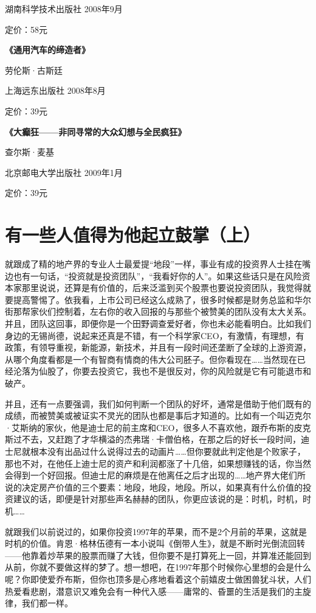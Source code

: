 湖南科学技术出版社 2008年9月

定价：58元

\textbf{《通用汽车的缔造者》}

劳伦斯·古斯廷

上海远东出版社 2008年8月

定价：39元

\textbf{《大癫狂------非同寻常的大众幻想与全民疯狂》}

查尔斯·麦基

北京邮电大学出版社 2009年1月

定价：39元

\section{有一些人值得为他起立鼓掌（上）}

就跟成了精的地产界的专业人士最爱提``地段''一样，事业有成的投资界人士挂在嘴边也有一句话，``投资就是投资团队''，``我看好你的人''。如果这些话只是在风险资本家那里说说，还算是有价值的，后来泛滥到买个股票也要说投资团队，我觉得就要提高警惕了。依我看，上市公司已经这么成熟了，很多时候都是财务总监和华尔街那帮家伙们控制着，左右你的收入回报的与那些个被赞美的团队没有太大关系。并且，团队这回事，即便你是一个田野调查爱好者，你也未必能看明白。比如我们身边的无锡尚德，说起来还真是不错，有一个科学家CEO，有激情，有理想，有政策，有领导重视，新能源，新技术，并且有一段时间还垄断了全球的上游资源，从哪个角度看都是一个有智商有情商的伟大公司胚子。但你看现在\ldots{}\ldots{}当然现在已经沦落为仙股了，你要去投资它，我也不是很反对，你的风险就是它有可能退市和破产。

并且，还有一点要强调，我们如何判断一个团队的好坏，通常是借助于他们既有的成绩，而被赞美或被证实不灵光的团队也都是事后才知道的。比如有一个叫迈克尔·艾斯纳的家伙，他是迪士尼的前主席和CEO，很多人不喜欢他，跟乔布斯的皮克斯过不去，又赶跑了才华横溢的杰弗瑞·卡僧伯格，在那之后的好长一段时间，迪士尼就根本没有出品过什么说得过去的动画片\ldots{}\ldots{}但你要就此判定他是个败家子，那也不对，在他任上迪士尼的资产和利润都涨了十几倍，如果想赚钱的话，你当然会得到一个好回报。但迪士尼的麻烦是在他离任之后才出现的\ldots{}\ldots{}地产界大佬们所说的决定房产价值的三个要素：地段，地段，地段。所以，如果真有什么价值的投资建议的话，即便是针对那些声名赫赫的团队，你更应该说的是：时机，时机，时机\ldots{}\ldots{}

就跟我们以前说过的，如果你投资1997年的苹果，而不是2个月前的苹果，这就是时机的价值。肯恩·格林伍德有一本小说叫《倒带人生》，就是不断时光倒流回转------他靠着炒苹果的股票而赚了大钱，但你要不是打算死上一回，并算准还能回到从前，你就不要做这样的梦了。想一想吧，在1997年那个时候你心里想的会是什么呢？你即使爱乔布斯，但你也顶多是心疼地看着这个前嬉皮士做困兽犹斗状，人们热爱看悲剧，潜意识又难免会有一种代入感------庸常的、昏噩的生活是我们的主旋律，我们都一样。


